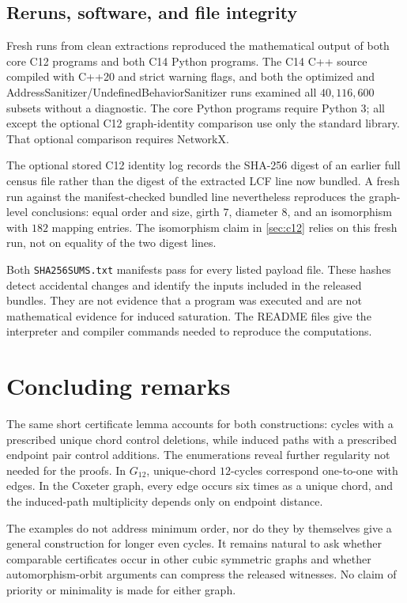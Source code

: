 \documentclass[11pt]{amsart}
\newcommand{\Gtwelve}{G_{12}}
\theoremstyle{definition}
\theoremstyle{remark}
\begin{document}
\subsection{Reruns, software, and file integrity}

Fresh runs from clean extractions reproduced the mathematical output of both
core C12 programs and both C14 Python programs.  The C14 C++ source compiled
with C++20 and strict warning flags, and both the optimized and
AddressSanitizer/UndefinedBehaviorSanitizer runs examined all
\(40{,}116{,}600\) subsets without a diagnostic.  The core Python programs
require Python 3; all except the optional C12 graph-identity comparison use
only the standard library.  That optional comparison requires NetworkX.

The optional stored C12 identity log records the SHA-256 digest of an earlier
full census file rather than the digest of the extracted LCF line now
bundled.  A fresh run against the manifest-checked bundled line nevertheless
reproduces the graph-level conclusions: equal order and size, girth \(7\),
diameter \(8\), and an isomorphism with \(182\) mapping entries.  The
isomorphism claim in \cref{sec:c12} relies on this fresh run, not on equality
of the two digest lines.

Both \texttt{SHA256SUMS.txt} manifests pass for every listed payload file.
These hashes detect accidental changes and identify the inputs included in
the released bundles.  They are not evidence that a program was executed and
are not mathematical evidence for induced saturation.  The README files give
the interpreter and compiler commands needed to reproduce the computations.

\section{Concluding remarks}\label{sec:conclusion}

The same short certificate lemma accounts for both constructions: cycles
with a prescribed unique chord control deletions, while induced paths with a
prescribed endpoint pair control additions.  The enumerations reveal further
regularity not needed for the proofs.  In \(\Gtwelve\), unique-chord
\(12\)-cycles correspond one-to-one with edges.  In the Coxeter graph, every
edge occurs six times as a unique chord, and the induced-path multiplicity
depends only on endpoint distance.

The examples do not address minimum order, nor do they by themselves give a
general construction for longer even cycles.  It remains natural to ask
whether comparable certificates occur in other cubic symmetric graphs and
whether automorphism-orbit arguments can compress the released witnesses.
No claim of priority or minimality is made for either graph.
\end{document}
